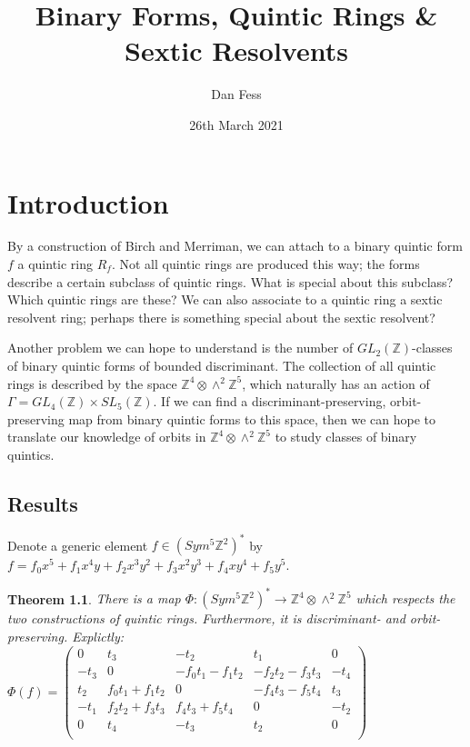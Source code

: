 \documentclass{report}
\begin{document}
\title{Binary Forms, Quintic Rings \& Sextic Resolvents}
\author{Dan Fess}
\date{26th March 2021}
\maketitle

\newtheorem{theorem}{Theorem}
\newtheorem{lemma}{Lemma}[section]
\newtheorem{prop}[lemma]{Proposition}
\newtheorem{corollary}[lemma]{Corollary}
\newtheorem{conjecture}{Conjecture}
\newtheorem{definition}[lemma]{Definition}

\chapter{Introduction}

By a construction of Birch and Merriman, we can attach to a binary quintic form $f$ a quintic ring $R_f$.  Not all quintic rings are produced this way; the forms describe a certain subclass of quintic rings.  What is special about this subclass?  Which quintic rings are these?  We can also associate to a quintic ring a sextic resolvent ring; perhaps there is something special about the sextic resolvent?

Another problem we can hope to understand is the number of $GL_2(\mathbb{Z})$-classes of binary quintic forms of bounded discriminant.  The collection of all quintic rings is described by the space $\mathbb{Z}^4 \otimes \wedge^2 \mathbb{Z}^5$, which naturally has an action of $\Gamma = GL_4(\mathbb{Z}) \times SL_5(\mathbb{Z})$.  If we can find a discriminant-preserving, orbit-preserving map from binary quintic forms to this space, then we can hope to translate our knowledge of orbits in $\mathbb{Z}^4 \otimes \wedge^2 \mathbb{Z}^5$ to study classes of binary quintics.

\section{Results}

Denote a generic element $f \in (Sym^5 \mathbb{Z}^2)^*$ by $f = f_0 x^5 + f_1 x^4 y + f_2 x^3 y^2 + f_3 x^2 y^3 + f_4 x y^4 + f_5 y^5$.

\begin{theorem}
There is a map $\Phi : (Sym^5 \mathbb{Z}^2)^* \to \mathbb{Z}^4 \otimes \wedge^2 \mathbb{Z}^5$ which respects the two constructions of quintic rings.  Furthermore, it is discriminant- and orbit-preserving.  Explictly:\\

$\Phi(f) = \begin{pmatrix}
0 & t_3 & - t_2 & t_1 & 0\\
- t_3 & 0 & -  f_0 t_1 -  f_1 t_2 & -  f_2 t_2 -  f_3 t_3 & - t_4\\
t_2 &  f_0 t_1 +  f_1 t_2 & 0 & -  f_4 t_3 -  f_5 t_4 & t_3\\
- t_1 &  f_2 t_2 +  f_3 t_3 &  f_4 t_3 +  f_5 t_4 & 0 & - t_2\\
0 & t_4 & - t_3 & t_2 & 0\\
\end{pmatrix}$\\
\end{theorem}
\end{document}
